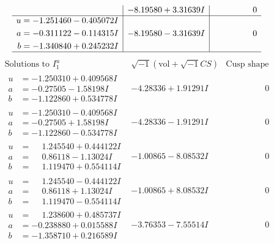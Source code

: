 \documentclass[1p]{elsarticle_modified}
\theoremstyle{definition}
\newcommand{\I}{\sqrt{-1}}
\begin{document}
$$\begin{array}{c|c|c}
 & -8.19580 + 3.31639 I & \phantom{-0.000000 } 0 \\ \hline\begin{aligned}
u &= -1.251460 - 0.405072 I \\
a &= -0.311122 - 0.114315 I \\
b &= -1.340840 + 0.245232 I\end{aligned}
 & -8.19580 - 3.31639 I & \phantom{-0.000000 } 0\\
 \hline 
 \end{array}$$\newpage$$\begin{array}{c|c|c}  
\text{Solutions to }I^u_{1}& \I (\text{vol} + \sqrt{-1}CS) & \text{Cusp shape}\\
 \hline 
\begin{aligned}
u &= -1.250310 + 0.409568 I \\
a &= -0.27505 - 1.58198 I \\
b &= -1.122860 + 0.534778 I\end{aligned}
 & -4.28336 + 1.91291 I & \phantom{-0.000000 } 0 \\ \hline\begin{aligned}
u &= -1.250310 - 0.409568 I \\
a &= -0.27505 + 1.58198 I \\
b &= -1.122860 - 0.534778 I\end{aligned}
 & -4.28336 - 1.91291 I & \phantom{-0.000000 } 0 \\ \hline\begin{aligned}
u &= \phantom{-}1.245540 + 0.444122 I \\
a &= \phantom{-}0.86118 - 1.13024 I \\
b &= \phantom{-}1.119470 + 0.554114 I\end{aligned}
 & -1.00865 - 8.08532 I & \phantom{-0.000000 } 0 \\ \hline\begin{aligned}
u &= \phantom{-}1.245540 - 0.444122 I \\
a &= \phantom{-}0.86118 + 1.13024 I \\
b &= \phantom{-}1.119470 - 0.554114 I\end{aligned}
 & -1.00865 + 8.08532 I & \phantom{-0.000000 } 0 \\ \hline\begin{aligned}
u &= \phantom{-}1.238600 + 0.485737 I \\
a &= -0.238880 + 0.015588 I \\
b &= -1.358710 + 0.216589 I\end{aligned}
 & -3.76353 - 7.55514 I & \phantom{-0.000000 } 0 \\ \hline\begin{aligned}

\end{aligned}
\end{array}$$
\end{document}
